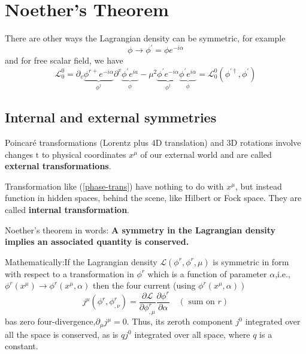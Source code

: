 \section{Noether's Theorem}
There are other ways the Lagrangian density can be symmetric, for example
\begin{equation}
\phi \rightarrow \phi^{\prime}=\phi e^{-i \alpha}
\label{phase-trans}
\end{equation}
and for free scalar field, we have
$$
\mathcal{L}_{0}^{0}=\partial_{v} \underbrace{\phi^{r+} e^{-i \alpha}}_{\phi^{\dagger}} \partial^{v} \underbrace{\phi^{\prime} e^{i a}}_{\phi}-\mu^{2} \underbrace{\phi^{\prime} e^{-i \alpha}}_{\phi^{\dagger}} \underbrace{\phi^{\prime} e^{i \alpha}}_{\phi}=\mathcal{L}_{0}^{0}\left(\phi^{\prime\dagger}, \phi^{\prime}\right)
$$
\subsection{Internal and external symmetries}
Poincaré transformations (Lorentz plus $4 \mathrm{D}$ translation) and $3 \mathrm{D}$ rotations involve changes $\mathrm{t}$ to physical coordinates $x^{\mu}$ of our external world and are called \textbf{external transformations}.

Transformation like (\ref{phase-trans}) have nothing to do with $x^{\mu}$, but instead function in hidden spaces, behind the scene, like Hilbert or Fock space. They are called \textbf{internal transformation}.
\begin{qt}
   Noether's theorem in words: \textbf{ A symmetry in the Lagrangian density implies an associated quantity is conserved.}
   
   Mathematically:If the Lagrangian density $\mathcal{L}\left(\phi^{r}, \phi^{r}, \mu\right)$ is symmetric in form with respect to a transformation in $\phi^{r}$ which is a function of parameter $\alpha$,i.e., $\phi^{r}\left(x^{\mu}\right) \rightarrow \phi^{r}\left(x^{\mu}, \alpha\right)$ then the four current (using $\left.\phi^{r}\left(x^{\mu}, \alpha\right)\right)$
   \begin{equation}
j^{\mu}\left(\phi^{r}, \phi_{, \nu}^{r}\right)=\frac{\partial \mathcal{L}}{\partial \phi_{, \mu}^{r}} \frac{\partial \phi^{r}}{\partial \alpha} \quad(\text { sum on } r)
\end{equation}
bas zero four-divergence,$\partial_{\mu} j^{\mu}=0$. Thus, its zeroth component $j^0$ integrated over all the space is conserved, as is $q j^{0}$ integrated over all space, where $q$ is a constant.
\end{qt}
